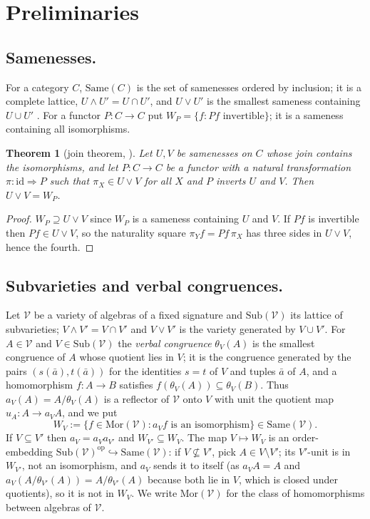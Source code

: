\documentclass[11pt]{amsart}
\newtheorem{thm}{Theorem}[section]
\theoremstyle{definition}
\newcommand{\Same}{\mathrm{Same}}
\newcommand{\Sub}{\mathrm{Sub}}
\newcommand{\Mor}{\mathrm{Mor}}
\newcommand{\sV}{\mathcal V}
\begin{document}
\section{Preliminaries}\label{sec:prelim}

\subsection{Samenesses.}
For a category $C$, $\Same(C)$ is the set of samenesses ordered by inclusion;
it is a complete lattice, $U\wedge U'=U\cap U'$, and $U\vee U'$ is the smallest
sameness containing $U\cup U'$ \cite{Same}. For a functor $P\colon C\to C$ put
$W_P=\{f:Pf\text{ invertible}\}$; it is a sameness containing all
isomorphisms.

\begin{thm}[join theorem, {\cite[Thm.~4.1]{Postnikov}}]\label{thm:join}
Let $U,V$ be samenesses on $C$ whose join contains the isomorphisms, and let
$P\colon C\to C$ be a functor with a natural transformation
$\pi\colon\mathrm{id}\Rightarrow P$ such that $\pi_X\in U\vee V$ for all $X$
and $P$ inverts $U$ and $V$. Then $U\vee V=W_P$.
\end{thm}
\begin{proof}
$W_P\supseteq U\vee V$ since $W_P$ is a sameness containing $U$ and $V$. If
$Pf$ is invertible then $Pf\in U\vee V$, so the naturality square
$\pi_Yf=Pf\,\pi_X$ has three sides in $U\vee V$, hence the fourth.
\end{proof}

\subsection{Subvarieties and verbal congruences.}
Let $\sV$ be a variety of algebras of a fixed signature and $\Sub(\sV)$ its
lattice of subvarieties; $V\wedge V'=V\cap V'$ and $V\vee V'$ is the variety
generated by $V\cup V'$. For $A\in\sV$ and $V\in\Sub(\sV)$ the \emph{verbal
congruence} $\theta_V(A)$ is the smallest congruence of $A$ whose quotient lies
in $V$; it is the congruence generated by the pairs $(s(\bar a),t(\bar a))$ for
the identities $s=t$ of $V$ and tuples $\bar a$ of $A$, and a homomorphism
$f\colon A\to B$ satisfies $f(\theta_V(A))\subseteq\theta_V(B)$. Thus
$a_V(A)=A/\theta_V(A)$ is a reflector of $\sV$ onto $V$ with unit the quotient
map $u_A\colon A\to a_VA$, and we put
\[
W_V:=\{f\in\Mor(\sV):a_Vf\text{ is an isomorphism}\}\in\Same(\sV).
\]
If $V\subseteq V'$ then $a_V=a_Va_{V'}$ and $W_{V'}\subseteq W_V$. The map
$V\mapsto W_V$ is an order-embedding $\Sub(\sV)^{\mathrm{op}}\hookrightarrow\Same(\sV)$:
if $V\not\subseteq V'$, pick $A\in V\setminus V'$; its $V'$-unit is in
$W_{V'}$, not an isomorphism, and $a_V$ sends it to itself (as $a_VA=A$ and
$a_V(A/\theta_{V'}(A))=A/\theta_{V'}(A)$ because both lie in $V$, which is closed under quotients), so it is not in
$W_V$. We write $\Mor(\sV)$ for the class of homomorphisms between algebras of
$\sV$.
\end{document}
